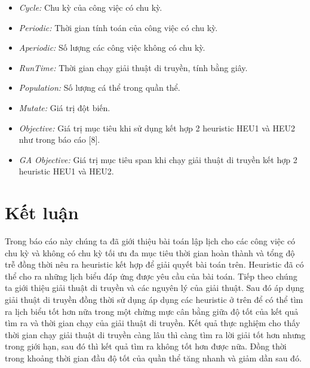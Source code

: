\documentclass[a4paper,12pt]{article}
\begin{document}
\begin{itemize}
\item
\textit{Cycle:} Chu kỳ của công việc có chu kỳ.
\item
\textit{Periodic:} Thời gian tính toán của công việc có chu kỳ.
\item
\textit{Aperiodic:} Số lượng các công việc không có chu kỳ.
\item
\textit{RunTime:} Thời gian chạy giải thuật di truyền, tính bằng giây.
\item
\textit{Population:} Số lượng cá thể trong quần thể.
\item
\textit{Mutate:} Giá trị đột biến.
\item
\textit{Objective:} Giá trị mục tiêu khi sử dụng kết hợp 2 heuristic HEU1 và HEU2 như trong báo cáo [8].
\item
\textit{GA Objective:} Giá trị mục tiêu span khi chạy giải thuật di truyền kết hợp 2 heuristic HEU1 và HEU2.
\end{itemize}
\section{Kết luận}
Trong báo cáo này chúng ta đã giới thiệu bài toán lập lịch cho các công việc có chu kỳ và không có chu kỳ tối ưu đa mục tiêu thời gian hoàn thành và tổng độ trễ đồng thời nêu ra heuristic kết hợp để giải quyết bài toán trên. Heuristic đã có thể cho ra những lịch biểu đáp ứng được yêu cầu của bài toán. Tiếp theo chúng ta giới thiệu giải thuật di truyền và các nguyên lý của giải thuật. Sau đó áp dụng giải thuật di truyền đồng thời sử dụng áp dụng các heuristic ở trên để có thể tìm ra lịch biểu tốt hơn nữa trong một chừng mực cân bằng giữa độ tốt của kết quả tìm ra và thời gian chạy của giải thuật di truyền. Kết quả thực nghiệm cho thấy thời gian chạy giải thuật di truyền càng lâu thì càng tìm ra lời giải tốt hơn nhưng trong giới hạn, sau đó thì kết quả tìm ra không tốt hơn được nữa. Đồng thời trong khoảng thời gian đầu độ tốt của quần thể tăng nhanh và giảm dần sau đó.
\end{document}
